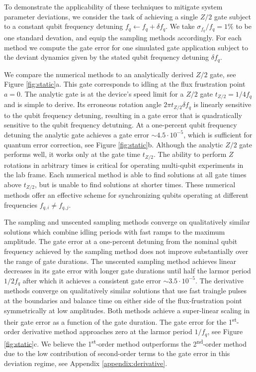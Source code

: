 To demonstrate the applicability of these techniques
to mitigate system parameter deviations,
we consider the task of achieving a single $Z/2$
gate subject to a constant qubit frequency detuning
$f_{q} \gets f_{q} + \delta f_{q}$.
We take $\sigma_{f_{q}} / f_{q} = 1\%$ to be one standard devation, and equip
the sampling methods accordingly. For each method we compute the gate error for
one simulated gate application subject to the deviant dynamics given by the
stated qubit frequency detuning $\delta f_{q}$.

We compare the numerical methods
to an analytically derived $Z/2$ gate, see Figure \ref{fig:static}a. This gate corresponds to
idling at the flux frustration point $a = 0$. The analytic gate
is at the device's speed limit for a $Z/2$ gate $t_{Z/2} = 1 / 4 f_{q}$ and
is simple to derive. Its erroneous rotation angle $2 \pi t_{Z/2} \delta f_{q}$ is linearly sensitive to
the qubit frequency detuning, resulting in a gate error that is quadratically sensitive
to the qubit frequency detutning.
At a one-percent
qubit frequency detuning the analytic gate achieves a gate error $\sim 4.5 \cdot 10^{-5}$,
which is sufficient for quantum error correction, see Figure \ref{fig:static}b.
Although the analytic $Z/2$ gate performs well, it works
only at the gate time $t_{Z/2}$. The ability to perform $Z$ rotations in arbitrary times is critical
for operating multi-qubit experiments in the lab frame.
Each numerical method is able to find solutions at
all gate times above $t_{Z/2}$, but is unable to find solutions at shorter times.
These numerical methods offer an effective scheme for synchronizing
qubits operating at different frequencies $f_{q, i} \neq f_{q, j}$.

The sampling and unscented sampling methods
converge on qualitatively similar solutions which combine idling periods
with fast ramps to the maximum amplitude. The gate error at a one-percent
detuning from the nominal qubit frequency achieved
by the sampling method does not improve substantially over the
range of gate durations. The unscented sampling method
achieves linear decreases in its gate error with longer gate durations
until half the larmor period $1 / 2 f_{q}$ after which it achieves a consistent
gate error $\sim 3.5 \cdot 10^{-5}$.
The derivative methods converge on qualitatively similar solutions that
use fast traingle pulses at the boundaries and balance time
on either side of the flux-frustration point symmetrically at low amplitudes.
Both methods achieve a super-linear scaling in their gate error as
a function of the gate duration. The gate error for the 1\textsuperscript{st}-order
derivative method approaches zero at the larmor period $1 / f_{q}$, see Figure \ref{fig:static}c.
We believe the 1\textsuperscript{st}-order method outperforms the 2\textsuperscript{nd}-order
method due to the low contribution of second-order
terms to the gate error in this deviation regime, see Appendix \ref{appendix:derivative}.


